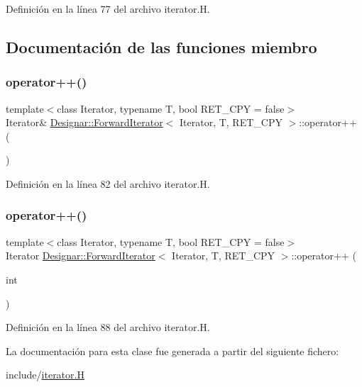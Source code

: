Definición en la línea 77 del archivo iterator.\+H.



\subsection{Documentación de las funciones miembro}
\mbox{\label{class_designar_1_1_forward_iterator_a021a9305def76c968872089a778d2b41}} 
\subsubsection{\texorpdfstring{operator++()}{operator++()}\hspace{0.1cm}{\footnotesize\ttfamily [1/2]}}
{\footnotesize\ttfamily template$<$class Iterator, typename T, bool R\+E\+T\+\_\+\+C\+PY = false$>$ \\
Iterator\& \hyperlink{class_designar_1_1_forward_iterator}{Designar\+::\+Forward\+Iterator}$<$ Iterator, T, R\+E\+T\+\_\+\+C\+PY $>$\+::operator++ (\begin{DoxyParamCaption}{ }\end{DoxyParamCaption})\hspace{0.3cm}{\ttfamily [inline]}}



Definición en la línea 82 del archivo iterator.\+H.

\mbox{\label{class_designar_1_1_forward_iterator_a7182625f3375ba05868ae6f240628b1c}} 
\subsubsection{\texorpdfstring{operator++()}{operator++()}\hspace{0.1cm}{\footnotesize\ttfamily [2/2]}}
{\footnotesize\ttfamily template$<$class Iterator, typename T, bool R\+E\+T\+\_\+\+C\+PY = false$>$ \\
Iterator \hyperlink{class_designar_1_1_forward_iterator}{Designar\+::\+Forward\+Iterator}$<$ Iterator, T, R\+E\+T\+\_\+\+C\+PY $>$\+::operator++ (\begin{DoxyParamCaption}\item[{int}]{ }\end{DoxyParamCaption})\hspace{0.3cm}{\ttfamily [inline]}}



Definición en la línea 88 del archivo iterator.\+H.



La documentación para esta clase fue generada a partir del siguiente fichero\+:\begin{DoxyCompactItemize}
\item 
include/\hyperlink{iterator_8_h}{iterator.\+H}\end{DoxyCompactItemize}
